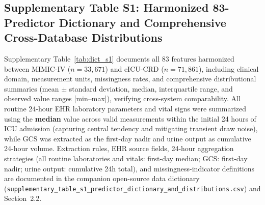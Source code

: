 \documentclass[utf8]{frontiers_suppmat}
\begin{document}
\subsection{Supplementary Table S1: Harmonized 83-Predictor Dictionary and Comprehensive Cross-Database Distributions}
\label{sec:tab_s1}

Supplementary Table~\ref{tab:dict_s1} documents all 83 features harmonized between MIMIC-IV ($n = 33{,}671$) and eICU-CRD ($n = 71{,}861$), including clinical domain, measurement units, missingness rates, and comprehensive distributional summaries (mean $\pm$ standard deviation, median, interquartile range, and observed value ranges [min--max]), verifying cross-system comparability. All routine 24-hour EHR laboratory parameters and vital signs were summarized using the \textbf{median} value across valid measurements within the initial 24 hours of ICU admission (capturing central tendency and mitigating transient draw noise), while GCS was extracted as the first-day nadir and urine output as cumulative 24-hour volume. Extraction rules, EHR source fields, 24-hour aggregation strategies (all routine laboratories and vitals: first-day median; GCS: first-day nadir; urine output: cumulative 24h total), and missingness-indicator definitions are documented in the companion open-source data dictionary (\texttt{supplementary\_table\_s1\_predictor\_dictionary\_and\_distributions.csv}) and Section~2.2.
\end{document}

